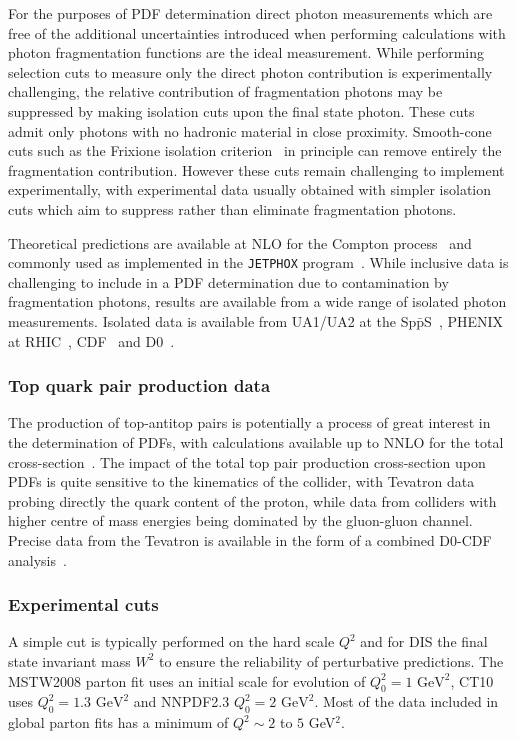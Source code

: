 For the purposes of PDF determination direct photon measurements which are free of the additional uncertainties introduced when performing calculations with photon fragmentation functions are the ideal measurement. While performing selection cuts to measure only the direct photon contribution is experimentally challenging, the relative contribution of fragmentation photons may be suppressed by making isolation cuts upon the final state photon. These cuts admit only photons with no hadronic material in close proximity. Smooth-cone cuts such as the Frixione isolation criterion~\cite{Frixione:1998jh} in principle can remove entirely the fragmentation contribution. However these cuts remain challenging to implement experimentally, with experimental data usually obtained with simpler isolation cuts which aim to suppress rather than eliminate fragmentation photons.

Theoretical predictions are available at NLO for the Compton process~\cite{Owens:1987qy,Aurenche:1988vi} and commonly used as implemented in the {\tt JETPHOX} program~\cite{Catani:2002ny,Aurenche:2006vj,Belghobsi:2009hx}. While inclusive data is challenging to include in a PDF determination due to contamination by fragmentation photons, results are available from a wide range of isolated photon measurements. Isolated data is available from  UA1/UA2 at the Sp$\bar{\mathrm{p}}$S~\cite{Albajar:1988im,Alitti:1992hn,Ansari:1988te}, PHENIX at RHIC~\cite{Adler:2006yt}, CDF~\cite{Aaltonen:2009ty,Abazov:2005wc,Abe:1994rra,Acosta:2002ya,Acosta:2004bg} and D0~\cite{Abachi:1996qz,Abazov:2001af,Abbott:1999kd}.

\subsubsection{Top quark pair production data}
The production of top-antitop pairs is potentially a process of great interest in the determination of PDFs, with calculations available up to NNLO for the total cross-section~\cite{Czakon:2013goa,Baernreuther:2012ws,Czakon:2012zr,Czakon:2012pz}. The impact of the total top pair production cross-section upon PDFs is quite sensitive to the kinematics of the collider, with Tevatron data probing directly the quark content of the proton, while data from colliders with higher centre of mass energies being dominated by the gluon-gluon channel. Precise data from the Tevatron is available in the form of a combined D0-CDF analysis~\cite{Aaltonen:2012ttbar}.

\subsubsection{Experimental cuts}
 A simple cut is typically performed on the hard scale $Q^2$ and for DIS the final state invariant mass $W^2$ to ensure the reliability of perturbative predictions. The MSTW2008 parton fit uses an initial scale for evolution of $Q_0^2=1$ $\mathrm{ GeV}^2$, CT10 uses $Q_0^2=1.3$ $\mathrm{ GeV}^2$ and NNPDF2.3 $Q_0^2=2$ $\mathrm{ GeV}^2$. Most of the data included in global parton fits has a minimum of $Q^2\sim2$ to $5$ GeV$^2$\cite{DeRoeck:2011na}.

